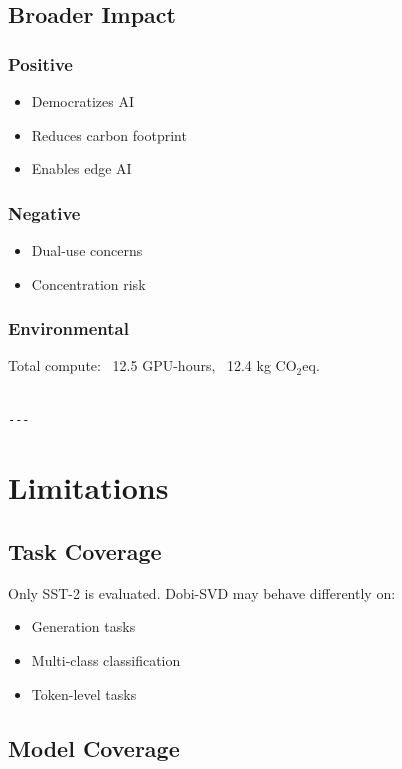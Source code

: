 \subsection{Broader Impact}

\subsubsection{Positive}
\begin{itemize}
\item Democratizes AI
\item Reduces carbon footprint
\item Enables edge AI

\end{itemize}
\subsubsection{Negative}
\begin{itemize}
\item Dual-use concerns
\item Concentration risk

\end{itemize}
\subsubsection{Environmental}
Total compute: ~12.5 GPU-hours, ~12.4 kg CO$_2$eq.
\begin{lstlisting}

---
\end{lstlisting}


\section{Limitations}

\subsection{Task Coverage}

Only SST-2 is evaluated. Dobi-SVD may behave differently on:
\begin{itemize}
\item Generation tasks
\item Multi-class classification
\item Token-level tasks

\end{itemize}
\subsection{Model Coverage}


